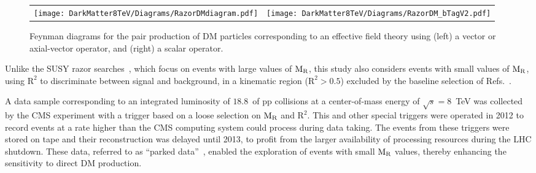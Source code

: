{{\begin{figure}[h!]
 \centering
 \begin{tabular}{cc}
    \hspace{-1cm}\texttt{[image: DarkMatter8TeV/Diagrams/RazorDMdiagram.pdf]}  & 
   \hspace{1cm}\texttt{[image: DarkMatter8TeV/Diagrams/RazorDM\_bTagV2.pdf]}
  \end{tabular}
 \caption{Feynman diagrams for the pair production of DM particles
   corresponding to an effective field theory using (left) a vector or
   axial-vector operator, and (right) a scalar operator.\label{fig:DMdiamgrams}}
\end{figure}


Unlike the SUSY razor searches~\cite{Razor8TeV,razor2010}, which focus on events with large
values of $\mathrm{M_{\rm R}}$, this study also considers events with small values
of $\mathrm{M_{\rm R}}$, using $\mathrm{R^2}$ to discriminate
between signal and background, in a kinematic region ($\mathrm{R^2} >
0.5$) excluded by the baseline selection of Refs.~\cite{Razor8TeV,razor2010}.

A data sample corresponding to an integrated luminosity of $18.8$~\fbinv of pp collisions at a center-of-mass energy of
$\sqrt{s}=8$~TeV  was collected by the CMS experiment %
 with a trigger based on a
loose selection on $\mathrm{M_{\rm R}}$ and $\mathrm{R^2}$. This and other
special triggers were operated in 2012 to record events at a rate
higher than the CMS computing system could process during data
taking. The events from these triggers were stored on tape and their
reconstruction was delayed until 2013, to profit from the larger availability of processing resources during the LHC shutdown. 
These data, referred to as ``parked data''~\cite{CMS-DP-2012-022},
enabled the exploration of events with small $\mathrm{M_{\rm R}}$
values, thereby enhancing the sensitivity to direct DM production.
 
}}
